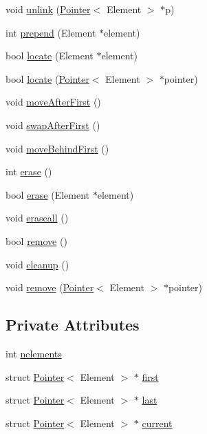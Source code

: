 \begin{CompactItemize}
\item 
void \hyperlink{classList_adc4059521dfe0939e87da556ad566c5}{unlink} (\hyperlink{structPointer}{Pointer}$<$ Element $>$ $\ast$p)
\item 
int \hyperlink{classList_24f0afaa932fd67d06dfb547056e7e8e}{prepend} (Element $\ast$element)
\item 
bool \hyperlink{classList_8d5c272adc1ff7f4dfa91a973bed46aa}{locate} (Element $\ast$element)
\item 
bool \hyperlink{classList_b065dc615002ea349deaa40f356b6ba9}{locate} (\hyperlink{structPointer}{Pointer}$<$ Element $>$ $\ast$pointer)
\item 
void \hyperlink{classList_65b63c90e638ab1fe2345bfbbd259a1c}{moveAfterFirst} ()
\item 
void \hyperlink{classList_16a214a0049ad988ca5ca33bd5723a70}{swapAfterFirst} ()
\item 
void \hyperlink{classList_fcf5aaa43e909b0a83d84ba8ffc763b2}{moveBehindFirst} ()
\item 
int \hyperlink{classList_a6817f9dc3c692ec329e876bf947438b}{erase} ()
\item 
bool \hyperlink{classList_c32f4741e6ac1c9115a062a3bbf7f945}{erase} (Element $\ast$element)
\item 
void \hyperlink{classList_b69f9a25fa64a36b2682617ee4e366db}{eraseall} ()
\item 
bool \hyperlink{classList_33f0e5433999d425b9f96570e2920c44}{remove} ()
\item 
void \hyperlink{classList_c07b709edf8b846d79990b4f1fea2aee}{cleanup} ()
\item 
void \hyperlink{classList_0cedb2527218b02e95b0106db775a10f}{remove} (\hyperlink{structPointer}{Pointer}$<$ Element $>$ $\ast$pointer)
\end{CompactItemize}
\subsection*{Private Attributes}
\begin{CompactItemize}
\item 
int \hyperlink{classList_60ebdaf4722b1bb0f7f800d3491de16d}{nelements}
\item 
struct \hyperlink{structPointer}{Pointer}$<$ Element $>$ $\ast$ \hyperlink{classList_1d25ef8162358067241410ef16a12911}{first}
\item 
struct \hyperlink{structPointer}{Pointer}$<$ Element $>$ $\ast$ \hyperlink{classList_f829e5f1698163f2820daf40dba9fc89}{last}
\item 
struct \hyperlink{structPointer}{Pointer}$<$ Element $>$ $\ast$ \hyperlink{classList_5c6e1ded5f9bf10f79df628d7970390f}{current}
\end{CompactItemize}



